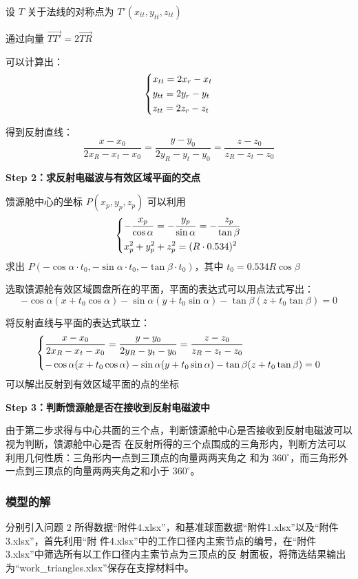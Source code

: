 \documentclass[withoutpreface,bwprint]{cumcmthesis} %
\begin{document}
设 $T$ 关于法线的对称点为 $T'(x_{tt},y_{tt},z_{tt})$

通过向量 $\overrightarrow{TT'}=2\overrightarrow{TR}$

可以计算出：
\[
    \begin{dcases}
        x_{tt}=2x_r-x_t \\
        y_{tt}=2y_r-y_t \\
        z_{tt}=2z_r-z_t \\
    \end{dcases}
\]

得到反射直线：
\[
    \frac{x-x_0}{2x_R-x_t-x_0} = \frac{y-y_0}{2y_R-y_t-y_0} = 
    \frac{z-z_0}{z_R-z_t-z_0}
\]

\textbf{Step 2：求反射电磁波与有效区域平面的交点}

馈源舱中心的坐标 $P(x_p,y_p,z_p)$ 可以利用
\[
    \begin{dcases}
        -\frac{x_p}{\cos\alpha} = -\frac{y_p}{\sin\alpha} = -\frac{z_p}{\tan\beta} \\
        x_p^2 + y_p^2 + z_p^2 = (R \cdot 0.534)^2
    \end{dcases}
\]
求出 $P(-\cos\alpha\cdot t_0,-\sin\alpha \cdot t_0,-\tan\beta\cdot t_0)$，其中
$t_0 = 0.534R\cos\beta$

选取馈源舱有效区域圆盘所在的平面，平面的表达式可以用点法式写出：
\[
    -\cos\alpha(x + t_0\cos\alpha) - \sin\alpha(y + t_0\sin\alpha) - 
    \tan\beta(z + t_0\tan\beta) = 0 
\]

将反射直线与平面的表达式联立：
\[
    \begin{dcases}
        \frac{x-x_0}{2x_R-x_t-x_0} = \frac{y-y_0}{2y_R-y_t-y_0} = 
        \frac{z-z_0}{z_R-z_t-z_0}  \\
        -\cos\alpha(x + t_0\cos\alpha) - \sin\alpha(y + t_0\sin\alpha) - 
        \tan\beta(z + t_0\tan\beta) = 0 
    \end{dcases}
\]
可以解出反射到有效区域平面的点的坐标

\textbf{Step 3：判断馈源舱是否在接收到反射电磁波中}

由于第二步求得与中心共面的三个点，判断馈源舱中心是否接收到反射电磁波可以视为判断，馈源舱中心是否
在反射所得的三个点围成的三角形内，判断方法可以利用几何性质：三角形内一点到三顶点的向量两两夹角之
和为 $360^\circ$，而三角形外一点到三顶点的向量两两夹角之和小于 $360^\circ$。
\subsubsection{模型的解}
分别引入问题 $2$ 所得数据“附件4.xlsx”，和基准球面数据“附件1.xlsx”以及“附件3.xlsx”，首先利用“附
件4.xlsx”中的工作口径内主索节点的编号，在“附件3.xlsx”中筛选所有以工作口径内主索节点为三顶点的反
射面板，将筛选结果输出为“work\_triangles.xlsx”保存在支撑材料中。
\end{document}
